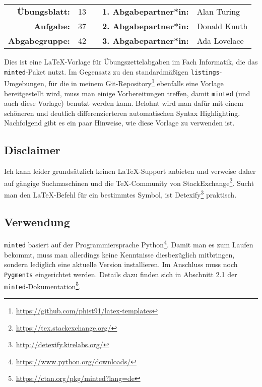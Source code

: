 
\newcommand{\obenlinks}{Name der Vorlesung}		%

\begin{center}
	\begin{tabular}{|rlp{4cm}rl|}
	\hline
	 \textbf{Übungsblatt:} & 13 &  & \textbf{1. Abgabepartner*in:} & Alan Turing  \\
	     \textbf{Aufgabe:} & 37 &  & \textbf{2. Abgabepartner*in:} & Donald Knuth \\
	\textbf{Abgabegruppe:} & 42 &  & \textbf{3. Abgabepartner*in:} & Ada Lovelace \\ \hline
\end{tabular}
\end{center} 

Dies ist eine \LaTeX-Vorlage für Übungszettelabgaben im Fach Informatik, die das \texttt{minted}-Paket nutzt.
Im Gegensatz zu den standardmäßigen \texttt{listings}-Umgebungen, für die in meinem Git-Repository\footnote{\url{https://github.com/phist91/latex-templates}} ebenfalls eine Vorlage bereitgestellt wird, muss man einige Vorbereitungen treffen, damit \texttt{minted} (und auch diese Vorlage) benutzt werden kann.
Belohnt wird man dafür mit einem schöneren und deutlich differenzierteren automatischen Syntax Highlighting.
Nachfolgend gibt es ein paar Hinweise, wie diese Vorlage zu verwenden ist.

\subsection*{Disclaimer}
Ich kann leider grundsätzlich keinen \LaTeX-Support anbieten und verweise daher auf gängige Suchmaschinen und die \TeX-Community von StackExchange\footnote{\url{https://tex.stackexchange.org/}}.		
Sucht man den LaTeX-Befehl für ein bestimmtes Symbol, ist Detexify\footnote{\url{http://detexify.kirelabs.org/}} praktisch.

\subsection*{Verwendung}
\texttt{minted} basiert auf der Programmiersprache Python\footnote{\url{https://www.python.org/downloads/}}.
Damit man es zum Laufen bekommt, muss man allerdings keine Kenntnisse diesbezüglich mitbringen, sondern lediglich eine aktuelle Version installieren.
Im Anschluss muss noch \texttt{Pygments} eingerichtet werden.
Details dazu finden sich in Abschnitt 2.1 der \texttt{minted}-Dokumentation\footnote{\url{https://ctan.org/pkg/minted?lang=de}}.


